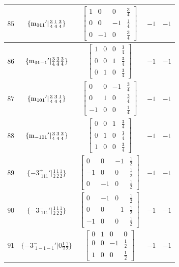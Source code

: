 \documentclass[fleqn,8pt]{jsarticle}
\begin{document}
\begin{longtable}{ccccc}
$ 85 $ & $ \{{\rm m}_{011}{}'|\frac{3}{4} \frac{1}{4} \frac{3}{4}\} $ & $ \begin{bmatrix} 1 & 0 & 0 & \frac{3}{4} \\ 0 & 0 & -1 & \frac{1}{4} \\ 0 & -1 & 0 & \frac{3}{4} \end{bmatrix} $ & $ -1 $ & $ -1 $ \\ \hline
$ 86 $ & $ \{{\rm m}_{01-1}{}'|\frac{3}{4} \frac{3}{4} \frac{3}{4}\} $ & $ \begin{bmatrix} 1 & 0 & 0 & \frac{3}{4} \\ 0 & 0 & 1 & \frac{3}{4} \\ 0 & 1 & 0 & \frac{3}{4} \end{bmatrix} $ & $ -1 $ & $ -1 $ \\ \hline
$ 87 $ & $ \{{\rm m}_{101}{}'|\frac{3}{4} \frac{3}{4} \frac{1}{4}\} $ & $ \begin{bmatrix} 0 & 0 & -1 & \frac{3}{4} \\ 0 & 1 & 0 & \frac{3}{4} \\ -1 & 0 & 0 & \frac{1}{4} \end{bmatrix} $ & $ -1 $ & $ -1 $ \\ \hline
$ 88 $ & $ \{{\rm m}_{-101}{}'|\frac{3}{4} \frac{3}{4} \frac{3}{4}\} $ & $ \begin{bmatrix} 0 & 0 & 1 & \frac{3}{4} \\ 0 & 1 & 0 & \frac{3}{4} \\ 1 & 0 & 0 & \frac{3}{4} \end{bmatrix} $ & $ -1 $ & $ -1 $ \\ \hline
$ 89 $ & $ \{-3^{+}_{\,\,111}{}'|\frac{1}{2} \frac{1}{2} \frac{1}{2}\} $ & $ \begin{bmatrix} 0 & 0 & -1 & \frac{1}{2} \\ -1 & 0 & 0 & \frac{1}{2} \\ 0 & -1 & 0 & \frac{1}{2} \end{bmatrix} $ & $ -1 $ & $ -1 $ \\ \hline
$ 90 $ & $ \{-3^{-}_{\,\,111}{}'|\frac{1}{2} \frac{1}{2} \frac{1}{2}\} $ & $ \begin{bmatrix} 0 & -1 & 0 & \frac{1}{2} \\ 0 & 0 & -1 & \frac{1}{2} \\ -1 & 0 & 0 & \frac{1}{2} \end{bmatrix} $ & $ -1 $ & $ -1 $ \\ \hline
$ 91 $ & $ \{-3^{-}_{\,\,1-1-1}{}'|0 \frac{1}{2} \frac{1}{2}\} $ & $ \begin{bmatrix} 0 & 1 & 0 & 0 \\ 0 & 0 & -1 & \frac{1}{2} \\ 1 & 0 & 0 & \frac{1}{2} \end{bmatrix} $ & $ -1 $ & $ -1 $ \\ \hline

\end{longtable}
\end{document}
